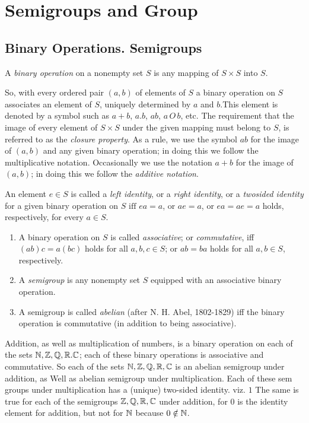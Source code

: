 \documentclass[12pt,class=book,crop=false]{standalone}
\begin{document}
\chapter{Semigroups and Group}
\section{Binary Operations. Semigroups}
\begin{defn}
    A \emph{binary operation} on a nonempty set $ S $ is any mapping of $ S\times S $ into $ S $.
\end{defn}

So, with every ordered pair $ (a,b) $ of elements of $ S $ a binary operation on $ S $ associates an element of $ S $, uniquely determined by $ a $ and $ b $.This element is denoted by a symbol such as $ a + b $, $ a.b $, $ ab $, $ a \,O\, b $, etc. The requirement that the image of every element of $ S \times S $ under the given mapping must belong to $ S $, is referred to as the \emph{closure property}. As a rule, we use the symbol $ ab $ for the image of $ (a, b) $ and any given binary operation; in doing this we follow the multiplicative notation. Occasionally we use the notation $ a + b $ for the image of $ (a, b) $; in doing this we follow the \emph{additive notation}.
\begin{defn}
    An element $ e \in S $ is called a \emph{left identity}, or a \emph{right identity}, or a \emph{twosided identity} for a given binary operation on $ S \text{ iff } ea = a $, or $ ae = a $, or $ ea = ae = a $ holds, respectively, for every $ a \in S $.
\end{defn}
\begin{defn}\label{defn:2.3}
    \hfill
    \begin{enumerate}[label={(\roman*)}]
        \item A binary operation on $ S $ is called \emph{associative}; or \emph{commutative}, iff $ (ab)c = a(bc) $ holds for all $ a, b, c \in S $; or $ ab = ba $ holds for all $ a, b \in S $, respectively.
        \item A \emph{semigroup} is any nonempty set $ S $ equipped with an associative binary operation.
        \item A semigroup is called \emph{abelian} (after N. H. Abel, 1802-1829) iff the binary operation is commutative (in addition to being associative).
    \end{enumerate}
\end{defn}
\begin{ex}
    Addition, as well as multiplication of numbers, is a binary operation on each of the sets $ \mathbb{N} , \mathbb{Z}, \mathbb{Q}, \mathbb{R}. \mathbb{C}$; each of these binary operations is associative and commutative. So each of the sets $\mathbb{N}, \mathbb{Z}, \mathbb{Q}, \mathbb{R}, \mathbb{C} $ is an abelian semigroup under addition, as Well as abelian semigroup under multiplication. Each of these sem groups under multiplication has a (unique) two-sided identity. viz. $ 1 $ The same is true for each of the semigroups $ \mathbb{Z}, \mathbb{Q}, \mathbb{R}, \mathbb{C} $ under addition, for $ 0 $  is the identity element for addition, but not for $ \mathbb{N} $ because $ 0\notin \mathbb{N} $.
\end{ex}
\end{document}
